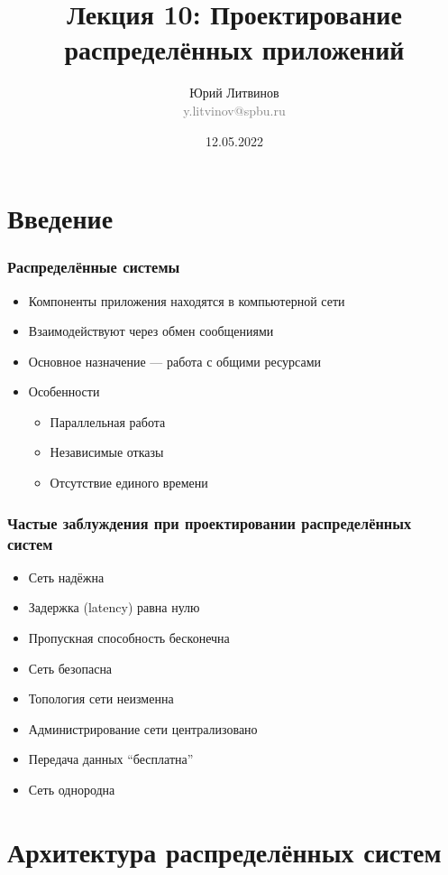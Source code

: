 \documentclass[xetex,mathserif,serif]{beamer}
\title{Лекция 10: Проектирование распределённых приложений}
\author[Юрий Литвинов]{Юрий Литвинов\\\small{\textcolor{gray}{y.litvinov@spbu.ru}}}
\date{12.05.2022}
\begin{document}
    
    \frame{\titlepage}

    \section{Введение}

    \begin{frame}
        \frametitle{Распределённые системы}
        \begin{itemize}
            \item Компоненты приложения находятся в компьютерной сети
            \item Взаимодействуют через обмен сообщениями
            \item Основное назначение --- работа с общими ресурсами
            \item Особенности
            \begin{itemize}
                \item Параллельная работа
                \item Независимые отказы
                \item Отсутствие единого времени
            \end{itemize}
        \end{itemize}
    \end{frame}

    \begin{frame}
        \frametitle{Частые заблуждения при проектировании распределённых систем}
        \begin{itemize}
            \item Сеть надёжна
            \item Задержка (latency) равна нулю
            \item Пропускная способность бесконечна
            \item Сеть безопасна
            \item Топология сети неизменна
            \item Администрирование сети централизовано
            \item Передача данных ``бесплатна''
            \item Сеть однородна
        \end{itemize}
    \end{frame}

    \section{Архитектура распределённых систем}
\end{document}
